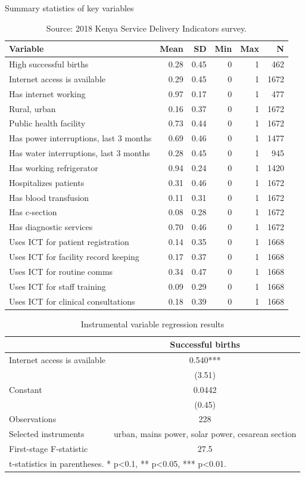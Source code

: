 \documentclass[12pt]{article}
\begin{document}
\begin{table}[htbp]
\centering
\caption{Summary statistics of key variables}
 \label{tab:summary}
\begin{tabular}{lrrrrr}
\toprule \toprule
Variable & Mean & SD & Min & Max & N \\
\midrule \midrule
High successful births & 0.28 & 0.45 & 0 & 1 & 462 \\
Internet access is available & 0.29 & 0.45 & 0 & 1 & 1672 \\
Has internet working & 0.97 & 0.17 & 0 & 1 & 477 \\
Rural, urban & 0.16 & 0.37 & 0 & 1 & 1672 \\
Public health facility & 0.73 & 0.44 & 0 & 1 & 1672 \\
Has power interruptions, last 3 months & 0.69 & 0.46 & 0 & 1 & 1477 \\
Has water interruptions, last 3 months & 0.28 & 0.45 & 0 & 1 & 945 \\
Has working refrigerator & 0.94 & 0.24 & 0 & 1 & 1420 \\
Hospitalizes patients & 0.31 & 0.46 & 0 & 1 & 1672 \\
Has blood transfusion & 0.11 & 0.31 & 0 & 1 & 1672 \\
Has c-section & 0.08 & 0.28 & 0 & 1 & 1672 \\
Has diagnostic services & 0.70 & 0.46 & 0 & 1 & 1672 \\
Uses ICT for patient registration & 0.14 & 0.35 & 0 & 1 & 1668 \\
Uses ICT for facility record keeping & 0.17 & 0.37 & 0 & 1 & 1668 \\
Uses ICT for routine comms & 0.34 & 0.47 & 0 & 1 & 1668 \\
Uses ICT for staff training & 0.09 & 0.29 & 0 & 1 & 1668 \\
Uses ICT for clinical consultations & 0.18 & 0.39 & 0 & 1 & 1668 \\
\bottomrule \bottomrule
\end{tabular}
\caption*{\footnotesize Source: 2018 Kenya Service Delivery Indicators survey.}
\end{table}

\begin{table}[htbp]
  \centering
  \caption{Instrumental variable regression results}
  \label{tab:results}
  \begin{tabular}{lc}
    \toprule
    & Successful births\\
    \midrule
    Internet access is available & 0.540***\\
    & (3.51)\\
    Constant & 0.0442\\
    & (0.45)\\
    \midrule
    Observations & 228\\
    Selected instruments & urban, mains power, solar power, cesarean section\\
    First-stage F-statistic & 27.5\\
    \bottomrule
    \multicolumn{2}{l}{\footnotesize{t-statistics in parentheses. * p<0.1, ** p<0.05, *** p<0.01.}}\\
  \end{tabular}
\end{table}
\end{document}
